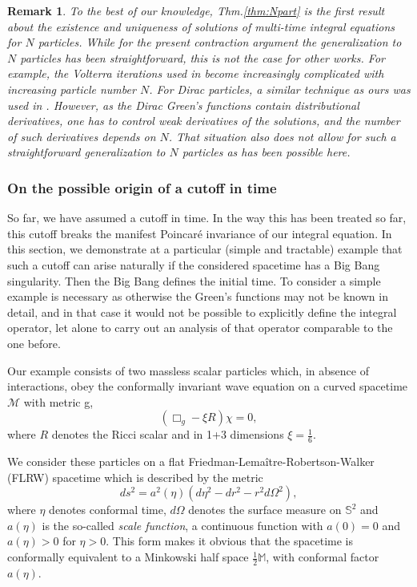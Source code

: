 \documentclass[b5paper,draft,openbib,12pt]{memoir}
\newtheorem{Remark}[Def]{Remark}
\newcommand{\M}{\mathbb{M}}
\begin{document}
\begin{Remark}
  To the best of our knowledge, Thm.\@ \ref{thm:Npart} 
  is the first result about the existence and 
  uniqueness of solutions of multi-time integral 
  equations for $N$ particles. While for the present 
  contraction argument the generalization to $N$ 
  particles has been straightforward, this is not 
  the case for other works. For example, the Volterra 
  iterations used in \cite{mtve} become increasingly 
  complicated with increasing particle number $N$. For 
  Dirac particles,  a similar technique as ours was 
  used in \cite{selfDirac}. However, as the Dirac 
  Green's functions contain distributional derivatives, 
  one has to control weak derivatives of the solutions, 
  and the number of such derivatives depends on $N$. 
  That situation also does not allow for such a 
  straightforward generalization to $N$ particles as 
  has been possible here.
\end{Remark}


\subsubsection{On the possible origin of a cutoff in 
time}
\label{sec:KGcurvedspacetime}

So far, we have assumed a cutoff in time. In the way 
this has been treated so far, this cutoff breaks the 
manifest Poincar\'e invariance of our integral 
equation. In this section, we demonstrate at a 
particular (simple and tractable) example that such a 
cutoff can arise naturally if the considered spacetime 
has a Big Bang singularity. Then the Big Bang defines 
the initial time. To consider a simple example is 
necessary as otherwise the Green's functions may not 
be known in detail, and in that case it would not be 
possible to explicitly define the integral operator, 
let alone to carry out an analysis of that operator 
comparable to the one before.

Our example consists of two massless scalar particles 
which, in absence of interactions, obey the conformally 
invariant wave equation on a curved spacetime 
$\mathcal{M}$ with metric g,
\begin{equation}
	\left( \Box_g - \xi R \right) \chi = 0,
	\label{eq:conformalwaveeq}
\end{equation}
where $R$ denotes the Ricci scalar and in 1+3 
dimensions $\xi = \frac{1}{6}$.

We consider these particles on a flat 
Friedman-Lema\^itre-Robertson-Walker (FLRW) spacetime 
which is described by the metric
\begin{equation}
	ds^2 = a^2(\eta) \left( d\eta^2 - dr^2 - r^2 d \Omega^2 \right),
\end{equation}
where $\eta$ denotes conformal time, $d \Omega$ 
denotes the surface measure on $\mathbb{S}^2$ and 
$a(\eta)$ is the so-called \textit{scale function}, a 
continuous function with $a(0) = 0$ and $a(\eta) > 0$ 
for $\eta >0$. This form makes it obvious that the 
spacetime is conformally equivalent to a Minkowski 
half space $\tfrac{1}{2}\M$, with conformal factor 
$a(\eta)$.
\end{document}
